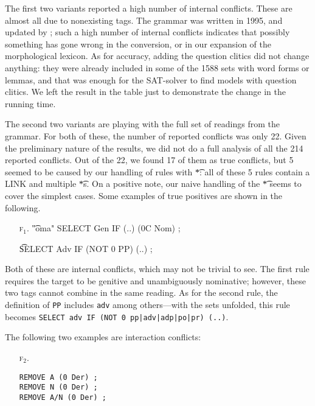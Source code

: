 {{The first two variants reported a high number of internal conflicts. 
These are almost all due to nonexisting tags. The grammar was written in 1995, and updated by ; such a high number of internal conflicts indicates that possibly something has gone wrong in the conversion, or in our expansion of the morphological lexicon.
As for accuracy, adding the question clitics did not change anything: they were already included in some of the 1588 sets with word forms or lemmas, and that was enough for the SAT-solver to find models with question clitics.
We left the result in the table just to demonstrate the change in the running time.


The second two variants are playing with the full set of readings from the grammar. For both of these, the number of reported conflicts was only 22.
Given the preliminary nature of the results, we did not do a full analysis of all the 214 reported conflicts.
Out of the 22, we found 17 of them as true conflicts,
 but 5 seemed to be caused by our handling of rules with \t{*}: all of these 5 rules contain a LINK and multiple \t{*}s. On a positive note, our naive handling of the \t{*} seems to cover the simplest cases.
Some examples of true positives are shown in the following.


\begin{itemize}
\item[\textsc{f$_1$}.]\t{"oma" SELECT Gen IF (..) (0C Nom) ;}

\item[] \t{SELECT Adv IF (NOT 0 PP) (..) ;}
\end{itemize}

Both of these are internal conflicts, which may not be trivial to see.
The first rule requires the target to be genitive and unambiguously nominative; however, these two tags cannot combine in the same reading.
As for the second rule, the definition of \texttt{PP} includes \texttt{adv} among others---with the sets unfolded, this rule becomes \texttt{SELECT~adv~IF~(NOT~0~pp|adv|adp|po|pr)~(..)}.

The following two examples are interaction conflicts:

\begin{itemize}
\item[\textsc{f$_2$}.]\begin{verbatim}
REMOVE A (0 Der) ; 
REMOVE N (0 Der) ; 
REMOVE A/N (0 Der) ; 
\end{verbatim}
\end{itemize}

}}
